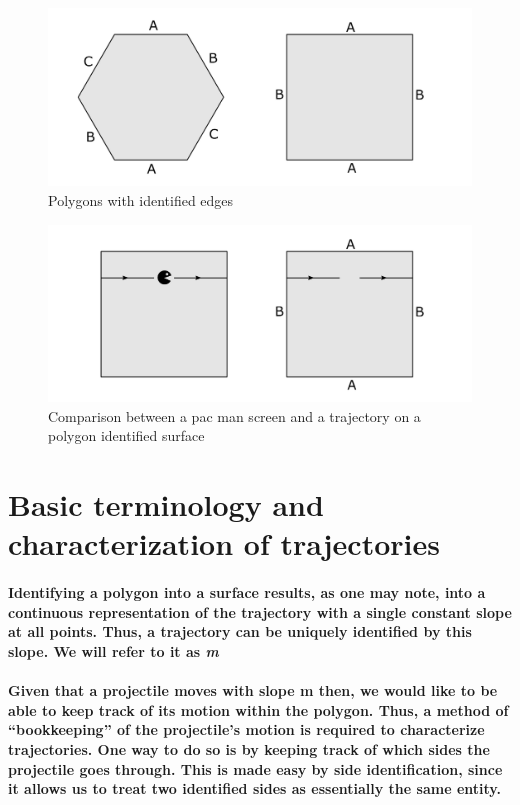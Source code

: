 \documentclass{report}
\begin{document}
\begin{center}
\begin{figure} 
\includegraphics[scale=0.3]{2}
\caption{Polygons with identified edges}
\end{figure}
\end{center}

\begin{center}
\begin{figure} 
\includegraphics[scale=0.3]{3}
\caption{Comparison between a pac man screen and a trajectory on a polygon identified surface}
\end{figure}
\end{center}

\section{Basic terminology and characterization of trajectories}
\paragraph{Identifying a polygon into a surface results, as one may note, into a continuous representation of the trajectory with a single constant slope at all points. Thus, a trajectory can be uniquely identified by this slope. We will refer to it as \textit{m}}

\paragraph{Given that a projectile moves with slope m then, we would like to be able to keep track of its motion within the polygon. Thus, a method of “bookkeeping” of the projectile’s motion is required to characterize trajectories. One way to do so is by keeping track of which sides the projectile goes through. This is made easy by side identification, since it allows us to treat two identified sides as essentially the same entity.}
\end{document}
